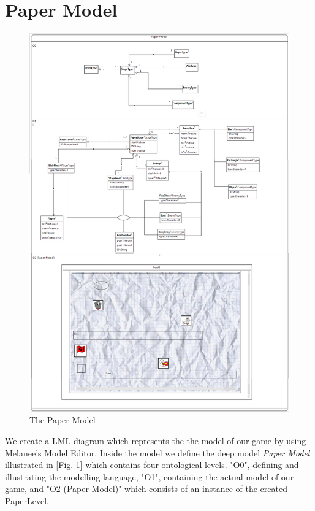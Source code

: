 \section{Paper Model}
\begin{figure}
	\centering
	\includegraphics[scale=0.32]{grafiken/paperModel.png}
	\caption{The Paper Model}
	\label{fig:6}
\end{figure}
We create a LML diagram which represents the the model of our game by using Melanee's Model Editor. Inside the model we define the deep model \textit{Paper Model} illustrated in [Fig. \ref{fig:6}] which contains four ontological levels. "O0", defining and illustrating the modelling language, "O1", containing the actual model of our game, and "O2 (Paper Model)" which consists of an instance of the created PaperLevel.
